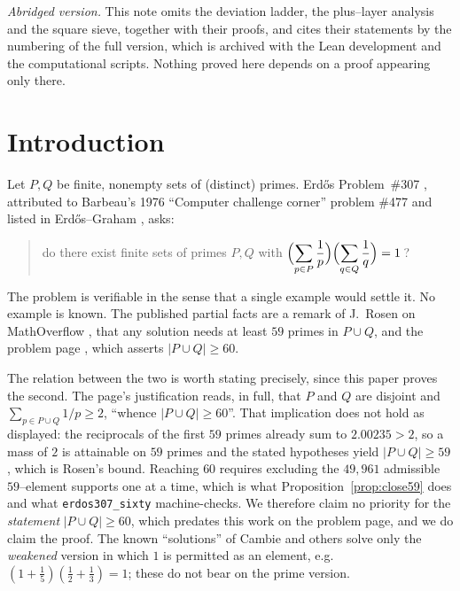 \documentclass[11pt]{article}
\theoremstyle{definition}
\begin{document}
\begin{center}\small\textit{Abridged version.} This note omits the deviation ladder, the plus--layer
analysis and the square sieve, together with their proofs, and cites their statements by the
numbering of the full version, which is archived with the Lean development and the computational
scripts. Nothing proved here depends on a proof appearing only there.\end{center}

\section{Introduction}\label{sec:intro}

Let $P,Q$ be finite, nonempty sets of (distinct) primes. Erd\H{o}s Problem~\#307
\cite{ErdosProblems307}, attributed to Barbeau's 1976 ``Computer challenge corner'' problem
\#477 \cite{Barbeau1976} and listed in Erd\H{o}s--Graham \cite{ErdosGraham1980}, asks:
\begin{quote}
do there exist finite sets of primes $P,Q$ with
$\displaystyle\Bigl(\sum_{p\in P}\frac1p\Bigr)\Bigl(\sum_{q\in Q}\frac1q\Bigr)=1$\,?
\end{quote}
The problem is verifiable in the sense that a single example would settle it. No example is known.
The published partial facts are a remark of J.~Rosen on MathOverflow \cite{MO320838}, that any
solution needs at least $59$ primes in $P\cup Q$, and the problem page \cite{ErdosProblems307},
which asserts $|P\cup Q|\ge60$.

The relation between the two is worth stating precisely, since this paper proves the second. The
page's justification reads, in full, that $P$ and $Q$ are disjoint and
$\sum_{p\in P\cup Q}1/p\ge2$, ``whence $|P\cup Q|\ge60$''. That implication does not hold as
displayed: the reciprocals of the first $59$ primes already sum to $2.00235>2$, so a mass of $2$ is
attainable on $59$ primes and the stated hypotheses yield $|P\cup Q|\ge59$, which is Rosen's bound.
Reaching $60$ requires excluding the $49{,}961$ admissible $59$--element supports one at a time,
which is what Proposition~\ref{prop:close59} does and what \texttt{erdos307\_sixty} machine-checks.
We therefore claim no priority for the \emph{statement} $|P\cup Q|\ge60$, which predates this work on
the problem page, and we do claim the proof. The known
``solutions'' of Cambie and others solve only the \emph{weakened} version in which $1$ is permitted
as an element, e.g.\ $(1+\tfrac15)(\tfrac12+\tfrac13)=1$; these do not bear on the prime version.
\end{document}
